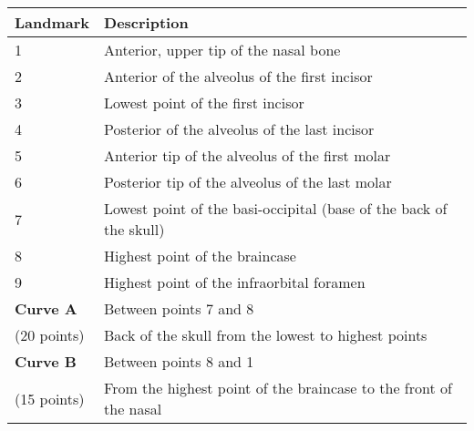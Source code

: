 
\begin{tabular}[t]{p{} p{}}		
\hline
\textbf{Landmark} & \textbf{Description} \\
\hline
1 & Anterior, upper tip of the nasal bone\\
2 & Anterior of the alveolus of the first incisor\\
3 & Lowest point of the first incisor\\
4& Posterior of the alveolus of the last incisor \\
5 & Anterior tip of the alveolus of the first molar\\
6 & Posterior tip of the alveolus of the last molar\\
7 & Lowest point of the basi-occipital (base of the back of the skull)\\
8 & Highest point of the braincase\\
9 & Highest point of the infraorbital foramen\\
\hline
\textbf{Curve A} & Between points 7 and 8  \\
(20 points)& Back of the skull from the lowest to highest points\\
\textbf{Curve B} & Between points 8 and 1  \\
(15 points)&From the highest point of the braincase to the front of the nasal \\
\hline
\end{tabular}